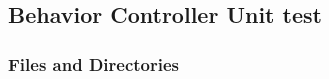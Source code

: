 \documentclass{CSSRforAfrica}
\begin{document}
%  



 \subsection{Behavior Controller Unit test} 
\label{subsection:behaviour_controller_test}


\subsubsection{Files and Directories}
\label{subsubsection:behaviour_controller_test_files}
 
\end{document}
